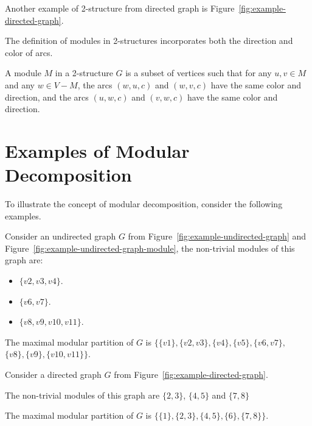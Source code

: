 Another example of 2-structure from directed graph is Figure~\ref{fig:example-directed-graph}.


The definition of modules in 2-structures incorporates both the direction and color of arcs.

\begin{mydef}
    A module $M$ in a 2-structure $G$ is a subset of vertices such that for any $u, v \in M$ and any $w \in V - M$, the arcs $(w, u, c)$ and $(w, v, c)$ have the same color and direction, and the arcs $(u, w, c)$ and $(v, w, c)$ have the same color and direction.
\end{mydef}


\section{Examples of Modular Decomposition}\label{sec:examples-of-modular-decomposition}

To illustrate the concept of modular decomposition, consider the following examples.


\begin{myex}
    \label{ex:simple-undirected-graph}

Consider an undirected graph $G$ from Figure~\ref{fig:example-undirected-graph} and Figure~\ref{fig:example-undirected-graph-module}, the non-trivial modules of this graph are:

\begin{itemize}
    \item $\{v2, v3, v4\}$.
    \item $\{v6, v7\}$.
    \item $\{v8, v9, v10, v11\}$.
\end{itemize}

The maximal modular partition of $G$ is $\{\{v1\}, \{v2, v3\}, \{v4\}, \{v5\}, \{v6, v7\},$ \\ $\{v8\}, \{v9\}, \{v10, v11\}\}$.
\end{myex}

\begin{myex}
    Consider a directed graph $G$ from Figure~\ref{fig:example-directed-graph}.

    The non-trivial modules of this graph are $\{2, 3\}$, $\{4, 5\}$ and $\{7, 8\}$

    The maximal modular partition of $G$ is $\{\{1\}, \{2, 3\}, \{4, 5\}, \{6\}, \{7, 8\}\}$.
\end{myex}


